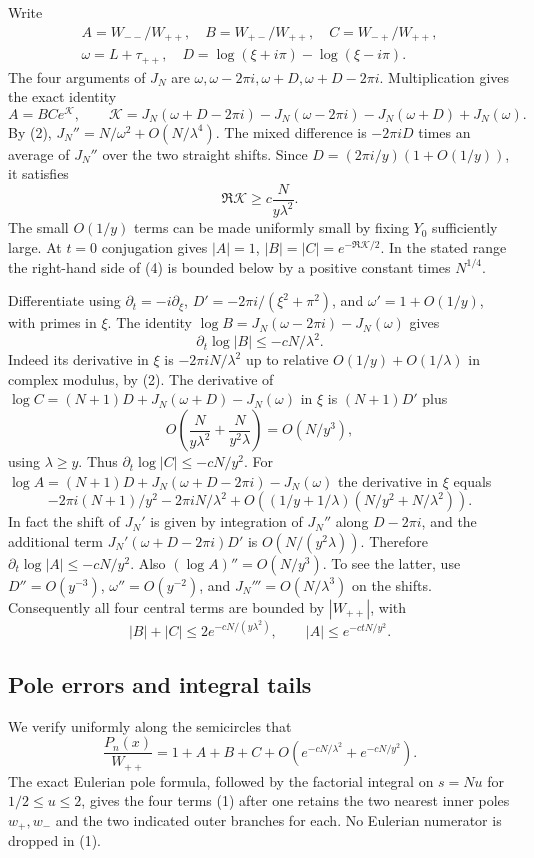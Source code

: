 \documentclass[11pt]{article}
\begin{document}
Write
\[
 \begin{gathered}A=W_{--}/W_{++},\quad B=W_{+-}/W_{++},\quad C=W_{-+}/W_{++},\\
 \omega=L+\tau_{++},\quad D=\log(\xi+i\pi)-\log(\xi-i\pi).\end{gathered}
\]
The four arguments of $J_N$ are $\omega,\omega-2\pi i,\omega+D,\omega+D-2\pi i$. Multiplication gives the exact identity
\[
 A=BCe^{\mathcal K},\qquad
 \mathcal K=J_N(\omega+D-2\pi i)-J_N(\omega-2\pi i)-J_N(\omega+D)+J_N(\omega).
\]
By (2), $J_N''=N/\omega^2+O(N/\lambda^4)$. The mixed difference is $-2\pi iD$ times an average of $J_N''$ over the two straight shifts. Since $D=(2\pi i/y)(1+O(1/y))$, it satisfies
\[
 \Re\mathcal K\ge c\frac{N}{y\lambda^2}.
 \tag{4}
\]
The small $O(1/y)$ terms can be made uniformly small by fixing $Y_0$ sufficiently large. At $t=0$ conjugation gives $|A|=1$, $|B|=|C|=e^{-\Re\mathcal K/2}$. In the stated range the right-hand side of (4) is bounded below by a positive constant times $N^{1/4}$.

Differentiate using $\partial_t=-i\partial_\xi$, $D'=-2\pi i/(\xi^2+\pi^2)$, and $\omega'=1+O(1/y)$, with primes in $\xi$. The identity $\log B=J_N(\omega-2\pi i)-J_N(\omega)$ gives
\[
 \partial_t\log|B|\le -c N/\lambda^2.
\]
Indeed its derivative in $\xi$ is $-2\pi iN/\lambda^2$ up to relative $O(1/y)+O(1/\lambda)$ in complex modulus, by (2). The derivative of $\log C=(N+1)D+J_N(\omega+D)-J_N(\omega)$ in $\xi$ is $(N+1)D'$ plus
\[
 O\!\left(\frac{N}{y\lambda^2}+\frac{N}{y^2\lambda}\right)=O(N/y^3),
\]
using $\lambda\ge y$. Thus $\partial_t\log|C|\le-cN/y^2$. For $\log A=(N+1)D+J_N(\omega+D-2\pi i)-J_N(\omega)$ the derivative in $\xi$ equals
\[
 -2\pi i(N+1)/y^2-2\pi iN/\lambda^2
 +O\!\left((1/y+1/\lambda)(N/y^2+N/\lambda^2)\right).
\]
In fact the shift of $J_N'$ is given by integration of $J_N''$ along $D-2\pi i$, and the additional term $J_N'(\omega+D-2\pi i)D'$ is $O(N/(y^2\lambda))$. Therefore $\partial_t\log|A|\le-cN/y^2$. Also $(\log A)''=O(N/y^3)$. To see the latter, use $D''=O(y^{-3})$, $\omega''=O(y^{-2})$, and $J_N'''=O(N/\lambda^3)$ on the shifts. Consequently all four central terms are bounded by $|W_{++}|$, with
\[
 |B|+|C|\le 2e^{-cN/(y\lambda^2)},\qquad
 |A|\le e^{-ctN/y^2}.
 \tag{5}
\]

\subsection{Pole errors and integral tails}

We verify uniformly along the semicircles that
\[
 \frac{P_n(x)}{W_{++}}=1+A+B+C
      +O(e^{-cN/\lambda^2}+e^{-cN/y^2}).
 \tag{6}
\]
The exact Eulerian pole formula, followed by the factorial integral on $s=Nu$ for $1/2\le u\le2$, gives the four terms (1) after one retains the two nearest inner poles $w_+,w_-$ and the two indicated outer branches for each. No Eulerian numerator is dropped in (1).
\end{document}
